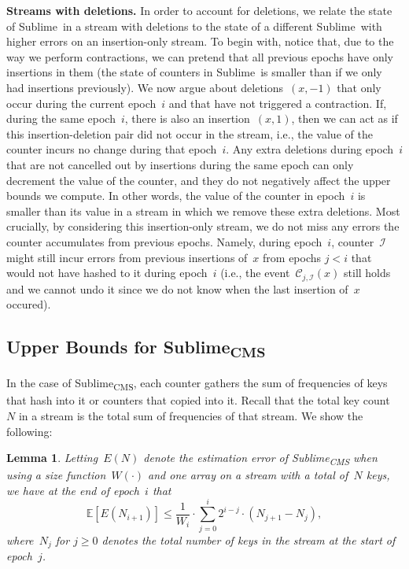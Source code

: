 \documentclass[sigconf]{acmart}
\newtheorem{lemma}[theorem]{Lemma}
\newcommand{\sketch}{Sublime}
\newcommand{\sketchcms}{\sketch\textsubscript{CMS}\xspace}
\newcommand{\expectation}[1]{\mathbb{E}\left[ #1 \right]}
\begin{document}
\medskip
\textbf{Streams with deletions.}
In order to account for deletions, we relate the state of \sketch\ in a stream
with deletions to the state of a different \sketch\ with higher errors on an
insertion-only stream. To begin with, notice that, due to the way we perform
contractions, we can pretend that all previous epochs have only insertions in
them (the state of counters in \sketch\ is smaller than if we only had
insertions previously). We now argue about deletions~$(x,-1)$ that only occur
during the current epoch~$i$ and that have not triggered a contraction. If,
during the same epoch~$i$, there is also an insertion~$(x,1)$, then we can act
as if this insertion-deletion pair did not occur in the stream, i.e., the value
of the counter incurs no change during that epoch~$i$. Any extra deletions
during epoch~$i$ that are not cancelled out by insertions during the same epoch
can only decrement the value of the counter, and they do not negatively affect
the upper bounds we compute. In other words, the value of the counter in
epoch~$i$ is smaller than its value in a stream in which we remove these extra
deletions. Most crucially, by considering this insertion-only stream, we do not
miss any errors the counter accumulates from previous epochs. Namely, during
epoch~$i$, counter~$\mathcal{I}$ might still incur errors from previous
insertions of~$x$ from epochs $j<i$ that would not have hashed to it during
epoch~$i$ (i.e., the event~$\mathcal{C}_{j,\mathcal{I}}(x)$ still holds and we
cannot undo it since we do not know when the last insertion of~$x$ occured).

\subsection{Upper Bounds for \sketchcms}\label{apx:upper_bounds_cms}
In the case of \sketchcms, each counter gathers the sum of frequencies of keys
that hash into it or counters that copied into it. Recall that the total key
count~$N$ in a stream is the total sum of frequencies of that stream. We show
the following:
\begin{lemma}\label{lemma:cms-w}
    Letting~$E(N)$ denote the estimation error of \sketchcms when using a size
    function~$W(\cdot)$ and one array on a stream with a total of~$N$ keys, we
    have at the end of epoch~$i$ that
	$$ \expectation{E(N_{i+1})} \leq  \frac{1}{W_i} \cdot \sum_{j=0}^i  2^{i-j} \cdot (N_{j+1} - N_j), $$
    where~$N_{j}$ for $j\geq 0$ denotes the total number of keys in the stream
    at the start of epoch~$j$. 
\end{lemma}
\end{document}
